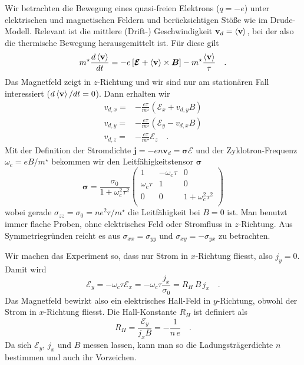 Wir betrachten die Bewegung eines quasi-freien Elektrons ($q=-e$) unter elektrischen und magnetischen Feldern und berücksichtigen Stöße wie im Drude-Modell. Relevant ist die mittlere (Drift-) Geschwindigkeit $\mathbf{v}_d = \braket{\mathbf{v}}$, bei der also die thermische Bewegung herausgemittelt ist. Für diese gilt
\begin{equation}
   m^\star \frac{d \braket{\mathbf{v} }} {dt} = 
   -e \left[ \bm{\mathcal{E}} + \braket{\mathbf{v}} \times \bm{B} \right] 
   - m^\star \frac{\braket{\mathbf{v}}}{\tau} \quad .
\end{equation}
Das Magnetfeld zeigt in $z$-Richtung und wir sind nur am stationären Fall interessiert ($d \braket{\mathbf{v} } / dt = 0$). Dann erhalten wir
\begin{align}
   v_{d,x} =& - \frac{e \tau}{m^\star} ( \mathcal{E}_x + v_{d,y} B ) \\
   v_{d,y} =& - \frac{e \tau}{m^\star} ( \mathcal{E}_y - v_{d,x} B ) \\
   v_{d,z} =& - \frac{e \tau}{m^\star} \mathcal{E}_z  \quad .
\end{align}
Mit der Definition der Stromdichte $\mathbf{j} = - e n \mathbf{v}_d = \bm{\sigma} \bm{\mathcal{E}}$ 
 und der Zyklotron-Frequenz $\omega_c = e B /m^\star$ 
 bekommen wir den Leitfähigkeitstensor $\bm{\sigma}$
\begin{equation}
   \bm{\sigma} = \frac{\sigma_0}{ 1+ \omega_c^2 \tau^2}
   \begin{pmatrix}
      1  & - \omega_c \tau & 0 \\
      \omega_c \tau & 1 & 0  \\
      0 & 0 & 1+ \omega_c^2 \tau^2 \\
   \end{pmatrix} \label{eq:4_sigma_tensor}
\end{equation}
wobei gerade $\sigma_{zz} = \sigma_0 = n e^2 \tau / m^\star $ die Leitfähigkeit bei $B=0$ ist. Man benutzt immer flache Proben, ohne elektrisches Feld oder Stromfluss in $z$-Richtung. Aus Symmetriegründen reicht es aus $\sigma_{xx} = \sigma_{yy}$ und $\sigma_{xy} = - \sigma_{yx}$ zu betrachten. 

Wir machen das Experiment so, dass nur Strom in $x$-Richtung fliesst, also $j_y = 0$. Damit wird 
\begin{equation}
   \mathcal{E}_y = - \omega_c \tau \mathcal{E}_x =  - \omega_c \tau \frac{j_x}{\sigma_0} = R_H \, B \, j_x \quad .
\end{equation}
Das Magnetfeld bewirkt also ein elektrisches Hall-Feld in $y$-Richtung, obwohl der Strom in $x$-Richtung fliesst. Die Hall-Konstante $R_H$ ist definiert als
\begin{equation}
   R_H = \frac{ \mathcal{E}_y }{j_x B} = - \frac{1}{n \, e} \quad .
\end{equation}
Da sich $\mathcal{E}_y$, $j_x$ und $B$ messen lassen, kann man so die Ladungsträgerdichte $n$ bestimmen und auch ihr Vorzeichen. 


